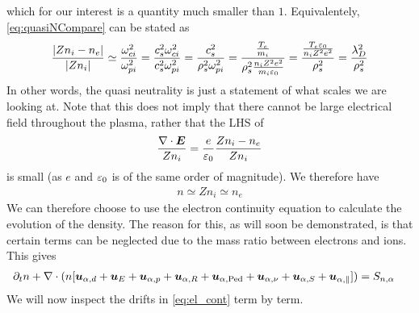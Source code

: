 %
which for our interest is a quantity much smaller than $1$.
Equivalentely, \cref{eq:quasiNCompare} can be stated as
%
\begin{align*}
    \frac{\left|Zn_i - n_e\right|}{\left|Zn_i\right|}
    \simeq
    \frac{\omega_{ci}^2}{\omega_{pi}^2}
    =
    \frac{c_s^2\omega_{ci}^2}{c_s^2\omega_{pi}^2}
    =
    \frac{c_s^2}{\rho_s^2\omega_{pi}^2}
    =
    \frac{\frac{T_e}{m_i}}{\rho_s^2\frac{n_iZ^2e^2}{m_i\varepsilon_0}}
    =
    \frac{\frac{T_e\varepsilon_0}{n_iZ^2e^2}}{\rho_s^2}
    =
    \frac{\lambda_D^2}{\rho_s^2}
\end{align*}
%
In other words, the quasi neutrality is just a statement of what scales we are looking at.
Note that this does not imply that there cannot be large electrical field throughout the plasma, rather that the LHS of
%
\begin{align*}
    \frac{\nabla\cdot \boldsymbol{E}}{Zn_i} = \frac{e}{\varepsilon_0}\frac{Zn_i-n_e}{Zn_i}
\end{align*}
%
is small (as $e$ and $\varepsilon_0$ is of the same order of magnitude).
We therefore have
%
\begin{align*}
    n\simeq Zn_i \simeq n_e
\end{align*}
%
We can therefore choose to use the electron continuity equation to calculate the evolution of the density.
The reason for this, as will soon be demonstrated, is that certain terms can be neglected due to the mass ratio between electrons and ions.
This gives
%
\begin{align}
 \partial_t n + \nabla\cdot (n [
 \boldsymbol{u}_{\alpha,d} + \boldsymbol{u}_E + \boldsymbol{u}_{\alpha,p} + \boldsymbol{u}_{\alpha,R}
 + \boldsymbol{u}_{\alpha,\text{Ped}}
 + \boldsymbol{u}_{\alpha,\nu}
 + \boldsymbol{u}_{\alpha,S} + \boldsymbol{u}_{\alpha,\|}
 ]) &= S_{n, \alpha}
 \label{eq:el_cont}
\end{align}
%
We will now inspect the drifts in \cref{eq:el_cont} term by term.

